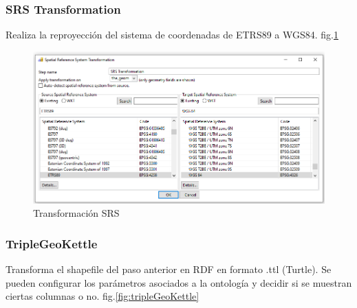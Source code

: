 \subsubsection{SRS Transformation}
Realiza la reproyección del sistema de coordenadas de ETRS89 a WGS84. fig.\ref{fig:SRS}

\begin{figure}[H]
    \includegraphics[width=\textwidth]{images/SRS.png}
    \centering
    \caption{Transformación SRS}
    \label{fig:SRS}
\end{figure}

\subsubsection{TripleGeoKettle}
Transforma el shapefile del paso anterior en RDF en formato .ttl (Turtle). Se pueden configurar los parámetros asociados a la
ontología y decidir si se muestran ciertas columnas o no. fig.\ref{fig:tripleGeoKettle}


